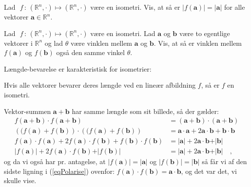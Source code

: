 \begin{exercise}
Lad $\,\,f\, : \, (\mathbb{R}^{n}, \cdot) \mapsto (\mathbb{R}^{n}, \cdot)$ være en isometri. Vis, at så er
$\vert f(\mathbf{a}) \vert = \vert \mathbf{a} \vert$ for alle vektorer $\mathbf{a} \in \mathbb{R}^{n}$.
\end{exercise}

\begin{exercise}
Lad $\,\,f\, : \, (\mathbb{R}^{n}, \cdot) \mapsto (\mathbb{R}^{n}, \cdot)$ være en isometri. Lad $\mathbf{a}$ og $\mathbf{b}$ være to egentlige vektorer i $\mathbb{R}^{n}$ og lad $\theta$ være vinklen mellem $\mathbf{a}$ og $\mathbf{b}$. Vis, at så er vinklen mellem
$f(\mathbf{a})$ og $f(\mathbf{b})$ også den samme vinkel $\theta$.
\end{exercise}

Længde-bevarelse er karakteristisk for isometrier:

\begin{theorem}
Hvis alle vektorer bevarer deres længde ved en lineær afbildning $f$, så er $f$ en isometri.
\end{theorem}
\begin{bevis}
Vektor-summen $\mathbf{a} + \mathbf{b}$ har samme længde som sit billede, så der gælder:
\begin{equation} \label{eqPolarise}
\begin{aligned}
f(\mathbf{a} + \mathbf{b}) \cdot f(\mathbf{a} + \mathbf{b}) &= (\mathbf{a} + \mathbf{b}) \cdot (\mathbf{a} + \mathbf{b}) \\
\left((f(\mathbf{a}) + f(\mathbf{b})\right) \cdot \left((f(\mathbf{a}) + f(\mathbf{b})\right) &= \mathbf{a}\cdot \mathbf{a} + 2\mathbf{a}\cdot \mathbf{b} + \mathbf{b}\cdot \mathbf{b} \\
f(\mathbf{a}) \cdot f(\mathbf{a}) + 2f(\mathbf{a}) \cdot f(\mathbf{b}) + f(\mathbf{b}) \cdot f(\mathbf{b}) &= \vert \mathbf{a} \vert + 2\mathbf{a}\cdot \mathbf{b} + \vert \mathbf{b} \vert \\
\vert f(\mathbf{a}) \vert + 2f(\mathbf{a}) \cdot f(\mathbf{b}) + \vert f(\mathbf{b})\vert &= \vert \mathbf{a} \vert + 2\mathbf{a}\cdot \mathbf{b} + \vert \mathbf{b} \vert \quad ,
\end{aligned}
\end{equation}
og da vi også har pr. antagelse, at $\vert f(\mathbf{a}) \vert = \vert \mathbf{a} \vert$ og $\vert f(\mathbf{b}) \vert = \vert \mathbf{b} \vert$ så får vi af den sidste ligning i (\ref{eqPolarise}) ovenfor: $f(\mathbf{a}) \cdot f(\mathbf{b}) = \mathbf{a}\cdot \mathbf{b}$, og det var det, vi skulle vise.
\end{bevis}

